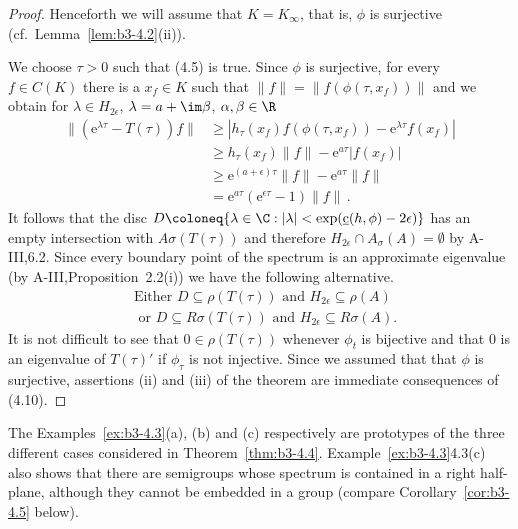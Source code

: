 \begin{proof}
	Henceforth we will assume that $K = K_{\infty}$, that is, $\phi$ is surjective (cf.\ Lemma~\ref{lem:b3-4.2}(ii)).
	
	We choose $\tau > 0$ such that (4.5) is true.
	Since $\phi$ is surjective, for every $f \in C(K)$ there is a $x_{f} \in K$ such that $\|f\| = \|f(\phi(\tau,x_{f}))\|$ and we obtain for $\lambda \in H_{2\epsilon}$, $\lambda = a + \im\beta$, $\alpha,\beta \in \R$
	\begin{equation}\label{eq:b3-4.9}
		\begin{aligned}
			\|(\mathrm{e}^{\lambda\tau} - T(\tau))f\| &\geq |h_{\tau}(x_{f})f(\phi(\tau,x_{f})) - \mathrm{e}^{\lambda\tau}f(x_{f})| \\
			&\geq h_{\tau}(x_{f})\|f\| - \mathrm{e}^{a\tau}|f(x_{f})| \\
			&\geq \mathrm{e}^{(a+\epsilon)\tau}\|f\| - \mathrm{e}^{a\tau}\|f\| \\
			&= \mathrm{e}^{a\tau}(\mathrm{e}^{\epsilon\tau} - 1)\|f\|\,.
		\end{aligned}
	\end{equation}
	It follows that the disc $D \coloneq \{\lambda \in \C : |\lambda| < \exp(\underbar{c}(h,\phi)-2\epsilon)\}$ has an empty intersection with $A{\sigma}(T(\tau))$ and therefore $H_{2\epsilon}\cap A_{\sigma}(A) = \emptyset$ by A-III,6.2.
	Since every boundary point of the spectrum is an approximate eigenvalue (by A-III,Proposition~2.2(i)) we have the following alternative.
	\begin{equation}\label{eq:b3-4.10}
		\begin{aligned}
		&\text{Either } D \subseteq \rho(T(\tau)) \text{ and } H_{2\epsilon} \subseteq \rho(A) \\
		&\text{ or } D \subseteq R{\sigma}(T(\tau)) \text{ and } H_{2\epsilon} \subseteq R{\sigma}(A).
	\end{aligned}
	\end{equation}
	It is not difficult to see that $0 \in \rho(T(\tau))$ whenever $\phi_{t}$ is bijective and that $0$ is an eigenvalue of $T(\tau)'$ if $\phi_{\tau}$ is not injective.
	Since we assumed that that $\phi$ is surjective, assertions (ii) and (iii) of the theorem are immediate consequences of (4.10).
\end{proof}
The Examples~\ref{ex:b3-4.3}(a), (b) and (c) respectively are prototypes of the three different cases considered in Theorem~\ref{thm:b3-4.4}.
Example~\ref{ex:b3-4.3}4.3(c) also shows that there are semigroups whose spectrum is contained in a right half-plane, although they cannot be embedded in a group (compare Corollary~\ref{cor:b3-4.5} below).
